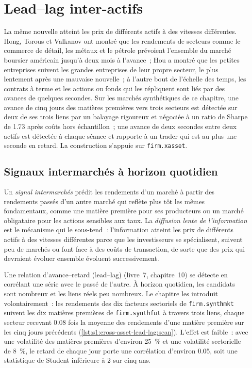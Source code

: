 \chapter{Lead--lag inter-actifs}\label{ch:s1:cross-asset-lead-lag}

La même nouvelle atteint les prix de différents actifs à des vitesses différentes. Hong, Torous et Valkanov ont montré que les rendements de secteurs comme le commerce de détail,
les métaux et le pétrole prévoient l'ensemble du marché boursier américain jusqu'à deux mois à l'avance~; Hou a montré que les petites entreprises suivent les grandes entreprises de leur propre secteur, le plus
lentement après une mauvaise nouvelle~; à l'autre bout de l'échelle des temps, les contrats à terme et les actions ou fonds qui les répliquent sont liés par des avances de quelques secondes. Sur les marchés synthétiques de ce
chapitre, une avance de cinq jours des matières premières vers trois secteurs est détectée sur deux de ses trois liens par un balayage rigoureux et négociée à un ratio de Sharpe de 1.73 après coûts hors échantillon~; une avance de deux
secondes entre deux actifs est détectée à chaque séance et rapporte à un trader qui est au plus une seconde
en retard. La construction s'appuie sur \texttt{firm.xasset}.

\section{Signaux intermarchés à horizon quotidien}

\begin{definition}\label{def:s1:cross-asset-lead-lag:intermarket}
Un \emph{signal intermarchés} prédit les rendements d'un marché à partir des rendements passés d'un autre marché qui reflète plus tôt les mêmes fondamentaux,
comme une matière première pour ses producteurs ou un marché obligataire pour les actions sensibles aux taux. La \emph{diffusion lente de l'information} est
le mécanisme qui le sous-tend~: l'information atteint les prix de différents actifs à des vitesses différentes parce que les investisseurs se spécialisent, suivent peu de marchés ou
font face à des coûts de transaction, de sorte que des prix qui devraient évoluer ensemble évoluent successivement.
\end{definition}

Une relation d'avance--retard (lead--lag) (livre~7, chapitre~10) se détecte en corrélant une série avec le passé de l'autre. À horizon quotidien, les candidats sont nombreux et
les liens réels peu nombreux. Le chapitre les introduit volontairement~: les rendements des dix facteurs sectoriels de \texttt{firm.synthmkt} suivent les dix matières premières de \texttt{firm.synthfut}
à travers trois liens, chaque secteur recevant 0.08 fois la moyenne des rendements d'une matière première sur les cinq jours précédents
(\cref{lst:s1:cross-asset-lead-lag:scan}). L'effet est faible~: avec une volatilité des matières premières d'environ 25~\% et une volatilité sectorielle de 8~\%, le retard de chaque jour
porte une corrélation d'environ 0.05, soit une statistique de Student inférieure à 2 sur cinq ans.

